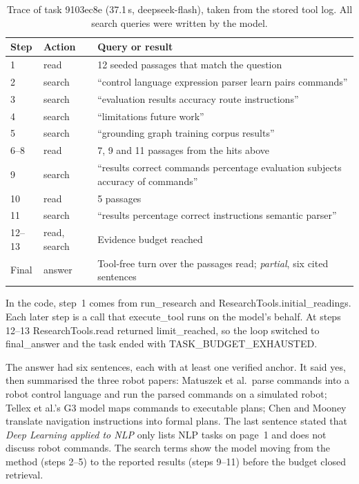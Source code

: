 \documentclass{article}
\newcommand{\code}[1]{{\ttfamily\small\hyphenchar\font=-1\relax #1}}
\begin{document}
\begin{table}[!hbp]
  \caption{Trace of task \code{9103ec8e} (37.1\,s, \code{deepseek-flash}), taken from the stored
  tool log. All search queries were written by the model.}
  \label{tab:trace}
  \small
  \begin{tabularx}{\linewidth}{@{}lP{1.6cm}Y@{}}
    \toprule
    Step & Action & Query or result \\
     & read & 12 seeded passages that match the question \\
    2 & search & ``control language expression parser learn pairs commands'' \\
    3 & search & ``evaluation results accuracy route instructions'' \\
    4 & search & ``limitations future work'' \\
    5 & search & ``grounding graph training corpus results'' \\
    6--8 & read & 7, 9 and 11 passages from the hits above \\
    9 & search & ``results correct commands percentage evaluation subjects accuracy of commands'' \\
    10 & read & 5 passages \\
    11 & search & ``results percentage correct instructions semantic parser'' \\
    12--13 & read, search & Evidence budget reached \\
    Final & answer & Tool-free turn over the passages read; \emph{partial}, six cited sentences \\
    \bottomrule
  \end{tabularx}
\end{table}

In the code, step~1 comes from \code{run\_research} and \code{ResearchTools.initial\_readings}. Each
later step is a call that \code{execute\_tool} runs on the model's behalf. At steps 12--13
\code{ResearchTools.read} returned \code{limit\_reached}, so the loop switched to
\code{final\_answer} and the task ended with \code{TASK\_BUDGET\_EXHAUSTED}.

\begin{samepage}
The answer had six sentences, each with at least one verified anchor. It said yes, then summarised the
three robot papers: Matuszek et al.\ parse commands into a robot control language and run the parsed
commands on a simulated robot; Tellex et al.'s G3 model maps commands to executable plans; Chen and
Mooney translate navigation instructions into formal plans. The last sentence stated that
\emph{Deep Learning applied to NLP} only lists NLP tasks on page~1 and does not discuss robot
commands. The search terms show the model moving from the method (steps 2--5) to the reported results
(steps 9--11) before the budget closed retrieval.\par
\end{samepage}
\end{document}
